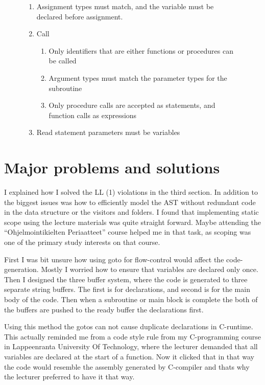 \documentclass[12pt,a4paper]{article}
\begin{document}
\begin{figure}
\begin{enumerate}
\begin{enumerate}
      \item Assignment types must match, and the variable must be declared before assignment.
      \item Call
        \begin{enumerate}
          \item Only identifiers that are either functions or procedures can be called
          \item Argument types must match the parameter types for the subroutine
          \item Only procedure calls are accepted as statements, and function calls as expressions
        \end{enumerate}
  \item Read statement parameters must be variables

    \end{enumerate}

\end{enumerate}

\end{figure}


\section{Major problems and solutions}

I explained how I solved the LL (1) violations in the third section.  In
addition to the biggest issues was how to efficiently model the AST without
redundant code in the data structure or the visitors and folders.  I found that
implementing static scope using the lecture materials was quite straight
forward.  Maybe attending the ``Ohjelmointikielten Periaatteet'' course helped me
in that task, as scoping was one of the primary study interests on that course.

First I was bit unsure how using goto for flow-control would affect the
code-generation.  Mostly I worried how to ensure that variables are declared
only once. Then I designed the three buffer system, where the code is generated
to three separate string buffers. The first is for declarations, and second is
for the main body of the code.  Then when a subroutine or main block is
complete the both of the buffers are pushed to the ready buffer the
declarations first. 

Using this method the gotos can not cause duplicate
declarations in C-runtime. This actually reminded me from a code style rule
from my C-programming course in Lappeenranta University Of Technology, where
the lecturer demanded that all variables are declared at the start of a
function. Now it clicked that in that way the code would resemble the assembly
generated by C-compiler and thats why the lecturer preferred to have it that
way.
\end{document}
